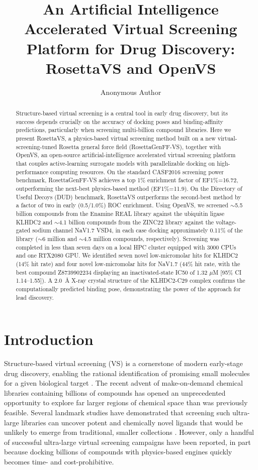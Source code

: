 \documentclass[11pt]{article}
\title{An Artificial Intelligence Accelerated Virtual Screening Platform for Drug Discovery: RosettaVS and OpenVS}
\author[1]{Anonymous Author}
\affil[1]{Anonymous Institution}
\date{}
\begin{document}
\maketitle

\begin{abstract}
Structure-based virtual screening is a central tool in early drug discovery, but its success depends crucially on the accuracy of docking poses and binding-affinity predictions, particularly when screening multi-billion compound libraries. Here we present RosettaVS, a physics-based virtual screening method built on a new virtual-screening-tuned Rosetta general force field (RosettaGenFF-VS), together with OpenVS, an open-source artificial-intelligence accelerated virtual screening platform that couples active-learning surrogate models with parallelizable docking on high-performance computing resources. On the standard CASF2016 screening power benchmark, RosettaGenFF-VS achieves a top 1\% enrichment factor of EF1\%=16.72, outperforming the next-best physics-based method (EF1\%=11.9). On the Directory of Useful Decoys (DUD) benchmark, RosettaVS outperforms the second-best method by a factor of two in early (0.5/1.0\%) ROC enrichment. Using OpenVS, we screened $\sim$5.5 billion compounds from the Enamine REAL library against the ubiquitin ligase KLHDC2 and $\sim$4.1 billion compounds from the ZINC22 library against the voltage-gated sodium channel NaV1.7 VSD4, in each case docking approximately 0.11\% of the library ($\sim$6 million and $\sim$4.5 million compounds, respectively). Screening was completed in less than seven days on a local HPC cluster equipped with 3000 CPUs and one RTX2080 GPU. We identified seven novel low-micromolar hits for KLHDC2 (14\% hit rate) and four novel low-micromolar hits for NaV1.7 (44\% hit rate, with the best compound Z8739902234 displaying an inactivated-state IC50 of 1.32 $\mu$M [95\% CI 1.14--1.55]). A 2.0~\AA{} X-ray crystal structure of the KLHDC2-C29 complex confirms the computationally predicted binding pose, demonstrating the power of the approach for lead discovery.
\end{abstract}

\section{Introduction}
Structure-based virtual screening (VS) is a cornerstone of modern early-stage drug discovery, enabling the rational identification of promising small molecules for a given biological target \citep{shoichet2004virtual,lyu2019ultralarge}. The recent advent of make-on-demand chemical libraries containing billions of compounds \citep{grygorenko2020generating,enamine2022} has opened an unprecedented opportunity to explore far larger regions of chemical space than was previously feasible. Several landmark studies have demonstrated that screening such ultra-large libraries can uncover potent and chemically novel ligands that would be unlikely to emerge from traditional, smaller collections \citep{lyu2019ultralarge,sadybekov2022synthon}. However, only a handful of successful ultra-large virtual screening campaigns have been reported, in part because docking billions of compounds with physics-based engines quickly becomes time- and cost-prohibitive.
\end{document}
